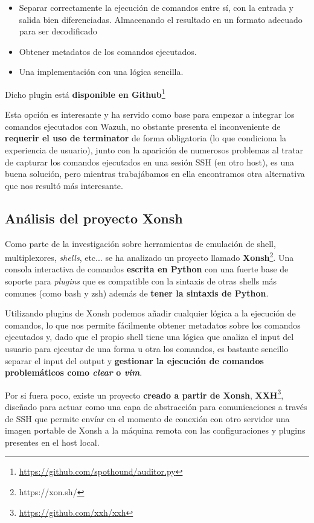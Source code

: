 \begin{itemize}
    \item Separar correctamente la ejecución de comandos entre sí, con la entrada y salida bien diferenciadas. Almacenando el resultado en un formato adecuado para ser decodificado
    \item Obtener metadatos de los comandos ejecutados.
    \item Una implementación con una lógica sencilla.
\end{itemize}

Dicho plugin está \textbf{disponible en Github}\footnote{\url{https://github.com/spothound/auditor.py}}

Esta opción es interesante y ha servido como base para empezar a integrar los comandos ejecutados con Wazuh, no obstante presenta el inconveniente de \textbf{requerir el uso de terminator} de forma obligatoria (lo que condiciona la experiencia de usuario), junto con la aparición de numerosos problemas al tratar de capturar los comandos ejecutados en una sesión SSH (en otro host), es una buena solución, pero mientras trabajábamos en ella encontramos otra alternativa que nos resultó más interesante.


\subsection{Análisis del proyecto Xonsh}

Como parte de la investigación sobre herramientas de emulación de shell, multiplexores, \textit{shells}, etc... se ha analizado un proyecto llamado \textbf{Xonsh}\footnote{https://xon.sh/}. Una consola interactiva de comandos \textbf{escrita en Python} con una fuerte base de soporte para \textit{plugins} que es compatible con la sintaxis de otras shells más comunes (como bash y zsh) además de \textbf{tener la sintaxis de Python}.

Utilizando plugins de Xonsh podemos añadir cualquier lógica a la ejecución de comandos, lo que nos permite fácilmente obtener metadatos sobre los comandos ejecutados y, dado que el propio shell tiene una lógica que analiza el input del usuario para ejecutar de una forma u otra los comandos, es bastante sencillo separar el input del output y \textbf{gestionar la ejecución de comandos problemáticos como \textit{clear} o \textit{vim}}. 

Por si fuera poco, existe un proyecto \textbf{creado a partir de Xonsh}, \textbf{XXH}\footnote{\url{https://github.com/xxh/xxh}}, diseñado para actuar como una capa de abstracción para comunicaciones a través de SSH que permite envíar en el momento de conexión con otro servidor una imagen portable de Xonsh a la máquina remota con las configuraciones y plugins presentes en el host local. 


